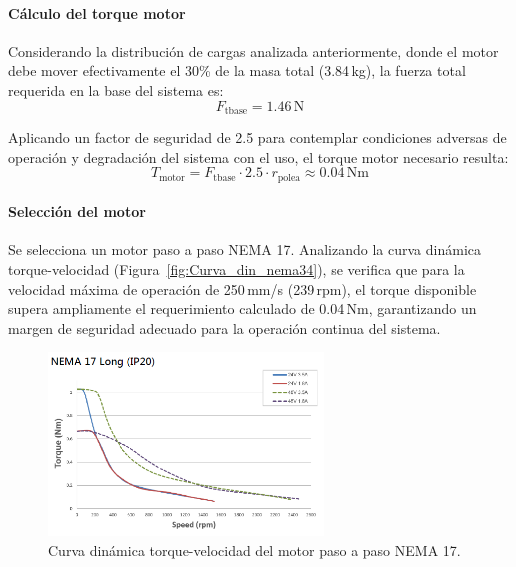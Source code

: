 \paragraph{Cálculo del torque motor}
Considerando la distribución de cargas analizada anteriormente, donde el motor debe mover efectivamente el 30\% de la masa total (3.84\,kg), la fuerza total requerida en la base del sistema es:
\begin{equation}
F_{\text{tbase}} = 1.46\,\text{N}
\end{equation}

Aplicando un factor de seguridad de 2.5 para contemplar condiciones adversas de operación y degradación del sistema con el uso, el torque motor necesario resulta:
\begin{equation}
T_{\text{motor}} = F_{\text{tbase}} \cdot 2.5 \cdot r_{\text{polea}} \approx 0.04\,\text{Nm}
\label{eq:torque_motor}
\end{equation}

\paragraph{Selección del motor}
Se selecciona un motor paso a paso NEMA 17. Analizando la curva dinámica torque-velocidad (Figura~\ref{fig:Curva_din_nema34}), se verifica que para la velocidad máxima de operación de 250\,mm/s (239\,rpm), el torque disponible supera ampliamente el requerimiento calculado de 0.04\,Nm, garantizando un margen de seguridad adecuado para la operación continua del sistema.

\begin{figure}[H]
    \centering
    \includegraphics[width=0.65\textwidth]{img/NEMA17.png}
    \caption{Curva dinámica torque-velocidad del motor paso a paso NEMA 17.}
    \label{fig:Curva_din_nema17}
\end{figure}